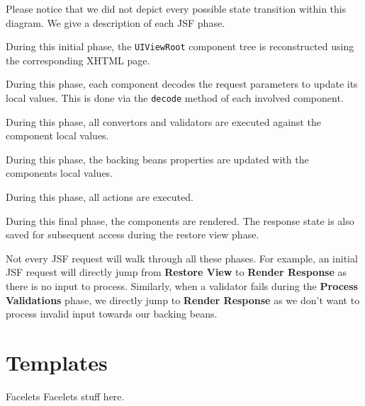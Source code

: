 Please notice that we did not depict every possible state transition within this diagram.
We give a description of each JSF phase.
\begin{description}[style=nextline]
	\item[Restore View]
	During this initial phase, the \texttt{UIViewRoot} component tree is reconstructed using the corresponding XHTML page.
	\item[Apply Request Values]
	During this phase, each component decodes the request parameters to update its local values.
	This is done via the \texttt{decode} method of each involved component.
	\item[Process Validations]
	During this phase, all convertors and validators are executed against the component local values.
	\item[Update Model Values]
	During this phase, the backing beans properties are updated with the components local values.
	\item[Invoke Application]
	During this phase, all actions are executed.
	\item[Render Response]
	During this final phase, the components are rendered.
	The response state is also saved for subsequent access during the restore view phase.
\end{description}
Not every JSF request will walk through all these phases. For example, an initial JSF request will directly jump from \textbf{Restore View} to \textbf{Render Response} as there is no input to process.
Similarly, when a validator fails during the \textbf{Process Validations} phase, we directly jump to \textbf{Render Response} as we don't want to process invalid input towards our backing beans.

\section{Templates}
\begin{TODO}{Facelets}
Facelets stuff here.
\end{TODO}

